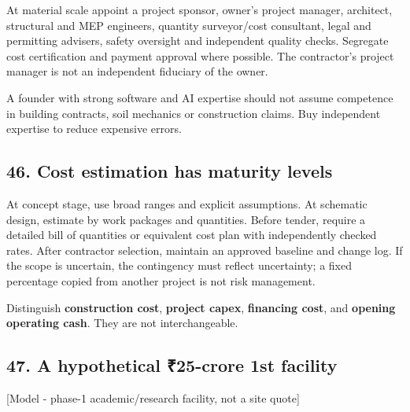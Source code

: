 At material scale appoint a project sponsor, owner's project manager, architect, structural and MEP engineers, quantity surveyor/cost consultant, legal and permitting advisers, safety oversight and independent quality checks. Segregate cost certification and payment approval where possible. The contractor's project manager is not an independent fiduciary of the owner.

A founder with strong software and AI expertise should not assume competence in building contracts, soil mechanics or construction claims. Buy independent expertise to reduce expensive errors.


\subsection{46. Cost estimation has maturity levels}

At concept stage, use broad ranges and explicit assumptions. At schematic design, estimate by work packages and quantities. Before tender, require a detailed bill of quantities or equivalent cost plan with independently checked rates. After contractor selection, maintain an approved baseline and change log. If the scope is uncertain, the contingency must reflect uncertainty; a fixed percentage copied from another project is not risk management.

Distinguish \textbf{construction cost}, \textbf{project capex}, \textbf{financing cost}, and \textbf{opening operating cash}. They are not interchangeable.


\subsection{47. A hypothetical \textnormal{₹}25-crore 1st facility}

[Model - phase-1 academic/research facility, not a site quote]

